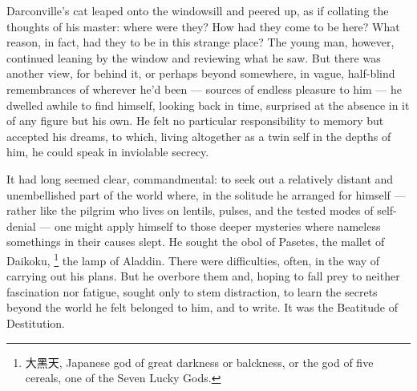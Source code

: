 Darconville's cat leaped onto the windowsill and peered 
up, as if collating
the thoughts of his master: where were they? How had they come to be here? What
reason, in fact, had they to be in this strange place? The young man, however,
continued leaning by the window and reviewing what he saw. But there was another
view, for behind it, or perhaps beyond somewhere, in vague, half-blind
remembrances of wherever he'd been --- sources of endless pleasure to him 
--- he dwelled awhile to find himself, looking back in time, surprised at the 
absence in it of
any figure but his own. He felt no particular responsibility to memory but
accepted his dreams, to which, living altogether as a twin self in the depths of
him, he could speak in inviolable secrecy.

  It had long seemed clear, commandmental: to seek out a relatively distant and
unembellished 
part of the world where, in the solitude he arranged for
himself ---rather like the pilgrim who lives on lentils, 
pulses, 
and the tested modes of self-denial --- one might apply himself to those deeper 
mysteries where nameless somethings in their causes slept. He sought the obol 
of Pasetes, the mallet 
of Daikoku, 
  \footnote{大黑天, Japanese god of great darkness or balckness, or the god of 
five cereals, one of the Seven Lucky Gods.}
the lamp of Aladdin. There were difficulties, often, in the
way of carrying out his plans. But he overbore them and, hoping to fall prey to
neither fascination nor fatigue, sought only to stem 
distraction, to learn the
secrets beyond the world he felt belonged to him, and to write. It was the
Beatitude 
of Destitution.

